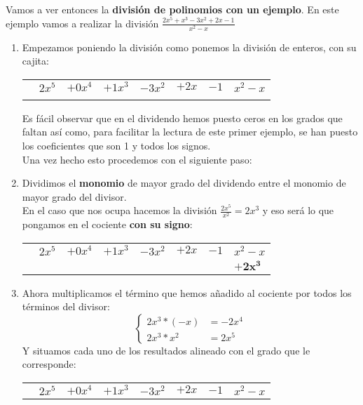 \documentclass[a4paper,11pt,answers]{exam}
\begin{document}
   Vamos a ver entonces la \textbf{división de polinomios con un ejemplo}. En este ejemplo vamos a realizar la división $\frac{2x^5 + x^3 - 3x^2 + 2x - 1}{x^2 - x}$
   \begin{enumerate}
   \item Empezamos poniendo la división como ponemos la división de enteros, con su cajita:
     \begin{center}
     \begin{tabular}{rrrrrrrr}
 &$2x^5$&$+0x^4$  &$+1x^3$  &$-3x^2$  &$+2x$  & \multicolumn{1}{r|}{$-1$} &  $x^2 - x$\\ \cline{8-8} 
 &  &  &  &  &  & & \phantom{a}
     \end{tabular}
   \end{center}
   Es fácil observar que en el dividendo hemos puesto ceros en los grados que faltan así como, para facilitar la lectura de este primer ejemplo, se han puesto los coeficientes que son 1 y todos los signos.\\
   Una vez hecho esto procedemos con el siguiente paso:
 \item Dividimos el \textbf{monomio} de mayor grado del dividendo entre el monomio de mayor grado del divisor. \label{repite_div}\\
   En el caso que nos ocupa hacemos la división $\frac{2x^5}{x^2}=2x^3$ y eso será lo que pongamos en el cociente \textbf{con su signo}:
   \begin{center}
     \begin{tabular}{rrrrrrrl}
 &$2x^5$&$+0x^4$  &$+1x^3$  &$-3x^2$  &$+2x$  & \multicolumn{1}{r|}{$-1$} &  $x^2 - x$\\ \cline{8-8} 
 &  &  &  &  &  & & $\boldsymbol{+2x^3}$
     \end{tabular}
   \end{center}
 \item Ahora multiplicamos el término que hemos añadido al cociente por todos los términos del divisor:
   \[\begin{cases}
       2x^3* (-x) &= -2x^4\\
       2x^3*x^2 &= 2x^5                                                                              \end{cases}\]
   Y situamos cada uno de los resultados alineado con el grado que le corresponde:
   \begin{center}
     \begin{tabular}{rrrrrrrl}
       &$2x^5$&$+0x^4$  &$+1x^3$  &$-3x^2$  &$+2x$  & \multicolumn{1}{r|}{$-1$} &  $x^2 - x$\\ \cline{8-8} 

\end{tabular}
\end{center}
\end{enumerate}
\end{document}
